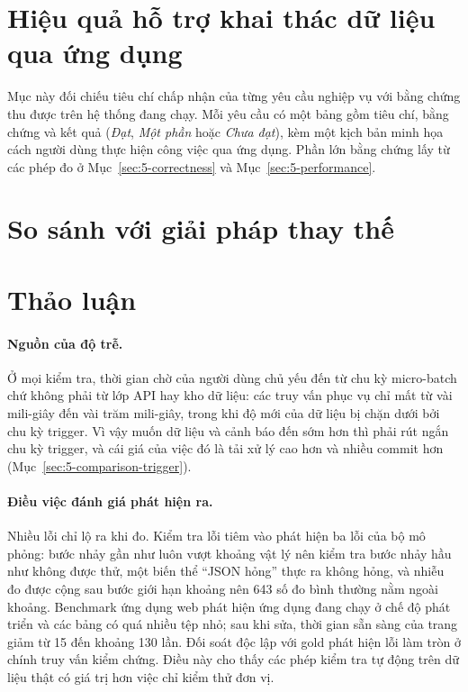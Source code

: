 



\section{Hiệu quả hỗ trợ khai thác dữ liệu qua ứng dụng}
\label{sec:5-effectiveness}
Mục này đối chiếu tiêu chí chấp nhận của từng yêu cầu nghiệp vụ với bằng chứng thu được trên hệ thống đang chạy. Mỗi yêu cầu có một bảng gồm tiêu chí, bằng chứng và kết quả (\emph{Đạt}, \emph{Một phần} hoặc \emph{Chưa đạt}), kèm một kịch bản minh họa cách người dùng thực hiện công việc qua ứng dụng. Phần lớn bằng chứng lấy từ các phép đo ở Mục~\ref{sec:5-correctness} và Mục~\ref{sec:5-performance}.









\section{So sánh với giải pháp thay thế}
\label{sec:5-comparison}



\section{Thảo luận}
\label{sec:5-discussion}

\paragraph{Nguồn của độ trễ.} Ở mọi kiểm tra, thời gian chờ của người dùng chủ yếu đến từ chu kỳ micro-batch chứ không phải từ lớp API hay kho dữ liệu: các truy vấn phục vụ chỉ mất từ vài mili-giây đến vài trăm mili-giây, trong khi độ mới của dữ liệu bị chặn dưới bởi chu kỳ trigger. Vì vậy muốn dữ liệu và cảnh báo đến sớm hơn thì phải rút ngắn chu kỳ trigger, và cái giá của việc đó là tải xử lý cao hơn và nhiều commit hơn (Mục~\ref{sec:5-comparison-trigger}).

\paragraph{Điều việc đánh giá phát hiện ra.} Nhiều lỗi chỉ lộ ra khi đo. Kiểm tra lỗi tiêm vào phát hiện ba lỗi của bộ mô phỏng: bước nhảy gần như luôn vượt khoảng vật lý nên kiểm tra bước nhảy hầu như không được thử, một biến thể ``JSON hỏng'' thực ra không hỏng, và nhiễu đo được cộng sau bước giới hạn khoảng nên 643 số đo bình thường nằm ngoài khoảng. Benchmark ứng dụng web phát hiện ứng dụng đang chạy ở chế độ phát triển và các bảng  có quá nhiều tệp nhỏ; sau khi sửa, thời gian sẵn sàng của trang giảm từ 15 đến khoảng 130 lần. Đối soát độc lập với gold phát hiện lỗi làm tròn ở chính truy vấn kiểm chứng. Điều này cho thấy các phép kiểm tra tự động trên dữ liệu thật có giá trị hơn việc chỉ kiểm thử đơn vị.

